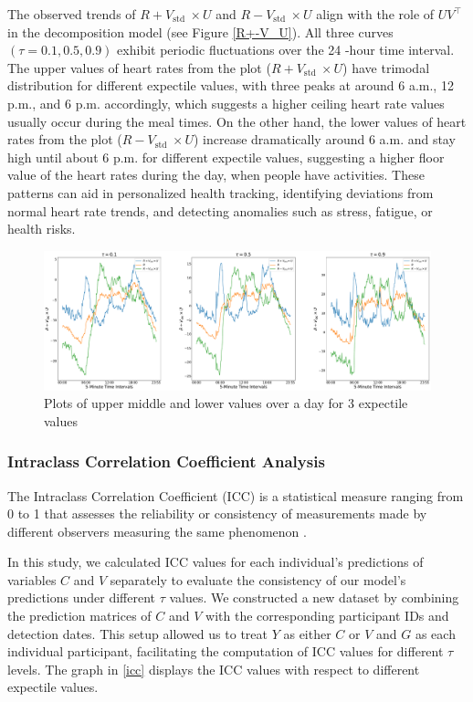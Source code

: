 \documentclass{article}
\begin{document}
The observed trends of $R+V_{\text {std }} \times U$ and $R-V_{\text {std }} \times U$ align with the role of $U V^{\top}$ in the decomposition model (see Figure \ref{R+-V_U}). All three curves $(\tau=0.1,0.5,0.9)$ exhibit periodic fluctuations over the 24 -hour time interval. The upper values of heart rates from the plot ($R+V_{\text {std }} \times U$) have trimodal distribution for different expectile values, with three peaks at around 6 a.m., 12 p.m., and 6 p.m. accordingly, which suggests a higher ceiling heart rate values usually occur during the meal times. On the other hand, the lower values of heart rates from the plot ($R-V_{\text {std }} \times U$) increase dramatically around 6 a.m. and stay high until about 6 p.m. for different expectile values, suggesting a higher floor value of the heart rates during the day, when people have activities. These patterns can aid in personalized health tracking, identifying deviations from normal heart rate trends, and detecting anomalies such as stress, fatigue, or health risks.

\begin{figure}[H]
\centering
\includegraphics[width=1\textwidth]{combined_three_tau_figures.pdf} 
\caption{Plots of upper middle and lower values over a day for 3 expectile values} 
\label{R+-V_U for 3 tau} 
\end{figure}

\subsubsection{Intraclass Correlation Coefficient Analysis}
The Intraclass Correlation Coefficient (ICC) is a statistical measure ranging from 0 to 1 that assesses the reliability or consistency of measurements made by different observers measuring the same phenomenon \cite{donner1986review}.

In this study, we calculated ICC values for each individual's predictions of variables $C$ and $V$ separately to evaluate the consistency of our model's predictions under different $\tau$ values. We constructed a new dataset by combining the prediction matrices of $C$ and $V$ with the corresponding participant IDs and detection dates. This setup allowed us to treat $Y$ as either $C$ or $V$ and $G$ as each individual participant, facilitating the computation of ICC values for different $\tau$ levels. The graph in \ref{icc} displays the ICC values with respect to different expectile values.
\end{document}
